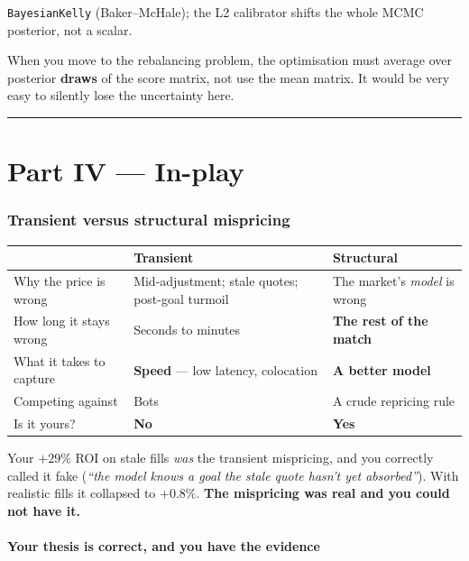 \documentclass[11pt,a4paper]{article}
\begin{document}
\begin{have}
\texttt{BayesianKelly} (Baker--McHale); the L2 calibrator shifts the whole MCMC posterior, not a scalar.
\end{have}
\begin{partialbox}[title={CARRY IT THROUGH}]
When you move to the rebalancing problem, the optimisation must average over posterior \textbf{draws} of the
score matrix, not use the mean matrix. It would be very easy to silently lose the uncertainty here.
\end{partialbox}

\bigskip\hrule\bigskip

\part*{Part IV --- In-play}

\section{Transient versus structural mispricing}

\begin{center}
\begin{tabular}{@{}p{4.0cm}p{5.2cm}p{5.4cm}@{}}
\toprule
& \textbf{Transient} & \textbf{Structural} \\
\midrule
Why the price is wrong & Mid-adjustment; stale quotes; post-goal turmoil & The market's \emph{model} is wrong \\
How long it stays wrong & Seconds to minutes & \textbf{The rest of the match} \\
What it takes to capture & \textbf{Speed} --- low latency, colocation & \textbf{A better model} \\
Competing against & Bots & A crude repricing rule \\
Is it yours? & \textbf{No} & \textbf{Yes} \\
\bottomrule
\end{tabular}
\end{center}

\noindent
Your $+29\%$ ROI on stale fills \emph{was} the transient mispricing, and you correctly called it fake
(\emph{``the model knows a goal the stale quote hasn't yet absorbed''}). With realistic fills it collapsed to
$+0.8\%$. \textbf{The mispricing was real and you could not have it.}

\subsection*{Your thesis is correct, and you have the evidence}
\end{document}
